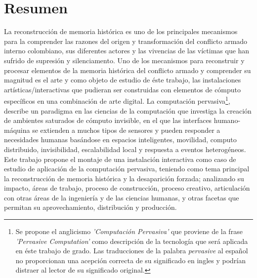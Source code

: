 \chapter*{Resumen}

La reconstrucción de memoria histórica es uno de los principales mecanismos para la comprender las razones del origen y transformación del conflicto armado interno colombiano, sus diferentes actores y las vivencias de las víctimas que han sufrido de supresión y silenciamento. Uno de los mecanismos para reconstruir y procesar elementos de la memoria histórica del conflicto armado y comprender su magnitud es el arte y como objeto de estudio de éste trabajo, las instalaciones artísticas/interactivas que pudieran ser construidas con elementos de cómputo específicos en una combinación de arte digital. La computación pervasiva\footnote{Se propone el anglicismo \textit{'Computación Pervasiva'} que proviene de la frase \textit{'Pervasive Computation'} como descripción de la tecnología que será aplicada en éste trabajo de grado. Las traducciones de la palabra  \textit{pervasive} al español no proporcionan una acepción correcta de su significado en ingles y podrían distraer al lector de su significado original.}, describe un paradigma en las ciencias de la computación que investiga la creación de ambientes saturados de cómputo invisible, en el que las interfaces humano-máquina se extienden a muchos tipos de sensores y pueden responder a necesidades humanas basándose en espacios inteligentes, movilidad, computo distribuido, invisibilidad, escalabilidad local y respuesta a eventos heterogéneos. Este trabajo propone el montaje de una instalación interactiva como caso de estudio de aplicación de la computación pervasiva, teniendo como tema principal la reconstrucción de memoria histórica y la desaparición forzada; analizando su impacto, áreas de trabajo, proceso de construcción, proceso creativo, articulación con otras áreas de la ingeniería y de las ciencias humanas, y otras facetas que permitan su aprovechamiento, distribución y producción. 
